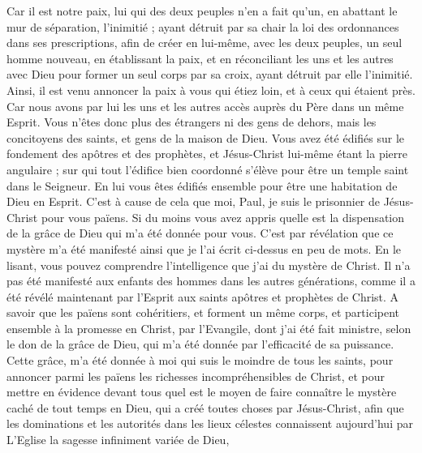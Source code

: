 \begin{multicols}{2}
Car il est notre paix, lui qui des deux peuples n’en a fait qu’un, en abattant le mur de séparation, l’inimitié ;
ayant détruit par sa chair la loi des ordonnances dans ses prescriptions, afin de créer en lui-même, avec les deux peuples, un seul homme nouveau, en établissant la paix,
et en réconciliant les uns et les autres avec Dieu pour former un seul corps par sa croix, ayant détruit par elle l'inimitié.
Ainsi, il est venu annoncer la paix à vous qui étiez loin, et à ceux qui étaient près.
Car nous avons par lui les uns et les autres accès auprès du Père dans un même Esprit.
Vous n'êtes donc plus des étrangers ni des gens de dehors, mais les concitoyens des saints, et gens de la maison de Dieu.
Vous avez été édifiés sur le fondement des apôtres et des prophètes, et Jésus-Christ lui-même étant la pierre angulaire ;
sur qui tout l'édifice bien coordonné s'élève pour être un temple saint dans le Seigneur.
En lui vous êtes édifiés ensemble pour être une habitation de Dieu en Esprit.
\VerseOne{}C’est à cause de cela que moi, Paul, je suis le prisonnier de Jésus-Christ pour vous païens.
Si du moins vous avez appris quelle est la dispensation de la grâce de Dieu qui m'a été donnée pour vous.
C’est par révélation que ce mystère m'a été manifesté ainsi que je l'ai écrit ci-dessus en peu de mots.
En le lisant, vous pouvez comprendre l'intelligence que j'ai du mystère de Christ.
Il n'a pas été manifesté aux enfants des hommes dans les autres générations, comme il a été révélé maintenant par l'Esprit aux saints apôtres et prophètes de Christ.
A savoir que les païens sont cohéritiers, et forment un même corps, et participent ensemble à la promesse en Christ, par l'Evangile,
dont j'ai été fait ministre, selon le don de la grâce de Dieu, qui m'a été donnée par l’efficacité de sa puissance.
Cette grâce, m'a été donnée à moi qui suis le moindre de tous les saints, pour annoncer parmi les païens les richesses incompréhensibles de Christ,
et pour mettre en évidence devant tous quel est le moyen de faire connaître le mystère caché de tout temps en Dieu, qui a créé toutes choses par Jésus-Christ,
afin que les dominations et les autorités dans les lieux célestes connaissent aujourd’hui par L’Eglise la sagesse infiniment variée de Dieu,

\end{multicols}
